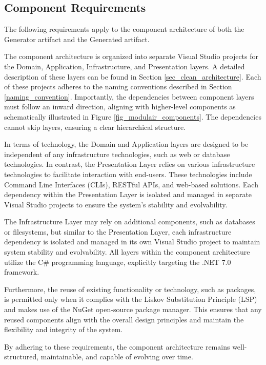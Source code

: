 \subsection{Component Requirements} \label{component_requirements}

The following requirements apply to the component architecture of both the Generator
artifact and the Generated artifact.

The component architecture is organized into separate Visual Studio projects for the
Domain, Application, Infrastructure, and Presentation layers. A detailed description of
these layers can be found in Section \ref{sec_clean_architecture}. Each of these projects adheres to
the naming conventions described in Section \ref{naming_convention}. Importantly, the
dependencies between component layers must follow an inward direction, aligning with
higher-level components as schematically illustrated in Figure
\ref{fig_modulair_components}. The dependencies cannot skip layers, ensuring a clear
hierarchical structure.

In terms of technology, the Domain and Application layers are designed to be independent
of any infrastructure technologies, such as web or database technologies. In contrast, the
Presentation Layer relies on various infrastructure technologies to facilitate interaction
with end-users. These technologies include Command Line Interfaces (CLIs), RESTful APIs,
and web-based solutions. Each dependency within the Presentation Layer is isolated and
managed in separate Visual Studio projects to ensure the system's stability and
evolvability.

The Infrastructure Layer may rely on additional components, such as databases or
filesystems, but similar to the Presentation Layer, each infrastructure dependency is
isolated and managed in its own Visual Studio project to maintain system stability and
evolvability. All layers within the component architecture utilize the C\# programming
language, explicitly targeting the .NET 7.0 framework.

Furthermore, the reuse of existing functionality or technology, such as packages, is
permitted only when it complies with the Liskov Substitution Principle (LSP) and makes use
of the NuGet open-source package manager. This ensures that any reused components align
with the overall design principles and maintain the flexibility and integrity of the
system.

By adhering to these requirements, the component architecture remains well-structured,
maintainable, and capable of evolving over time.
